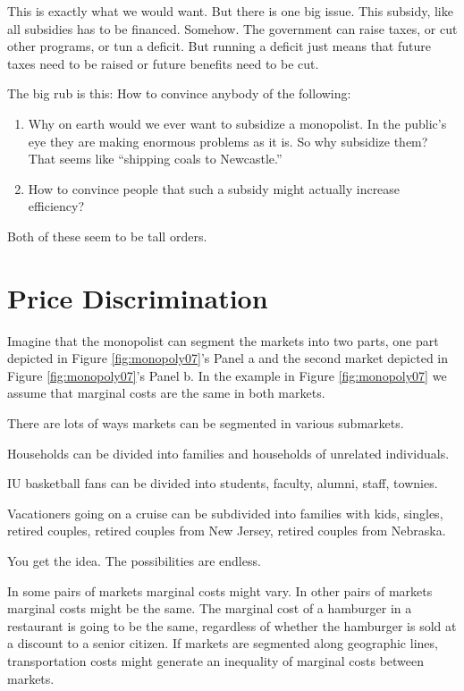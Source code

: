 \documentclass[
]{book}
\providecommand{\tightlist}{%
  \setlength{\itemsep}{0pt}\setlength{\parskip}{0pt}}
\begin{document}
This is exactly what we would want. But there is one big issue. This subsidy, like all subsidies has to be financed. Somehow. The government can raise taxes, or cut other programs, or tun a deficit. But running a deficit just means that future taxes need to be raised or future benefits need to be cut.

The big rub is this: How to convince anybody of the following:

\begin{enumerate}
\def\labelenumi{\arabic{enumi}.}
\tightlist
\item
  Why on earth would we ever want to subsidize a monopolist. In the public's eye they are making enormous problems as it is. So why subsidize them? That seems like ``shipping coals to Newcastle.''
\item
  How to convince people that such a subsidy might actually increase efficiency?
\end{enumerate}

Both of these seem to be tall orders.

\hypertarget{price-discrimination}{%
\section{Price Discrimination}\label{price-discrimination}}

Imagine that the monopolist can segment the markets into two parts, one part depicted in Figure \ref{fig:monopoly07}'s Panel a and the second market depicted in Figure \ref{fig:monopoly07}'s Panel b. In the example in Figure \ref{fig:monopoly07} we assume that marginal costs are the same in both markets.

There are lots of ways markets can be segmented in various submarkets.

Households can be divided into families and households of unrelated individuals.

IU basketball fans can be divided into students, faculty, alumni, staff, townies.

Vacationers going on a cruise can be subdivided into families with kids, singles, retired couples, retired couples from New Jersey, retired couples from Nebraska.

You get the idea. The possibilities are endless.

In some pairs of markets marginal costs might vary. In other pairs of markets marginal costs might be the same. The marginal cost of a hamburger in a restaurant is going to be the same, regardless of whether the hamburger is sold at a discount to a senior citizen. If markets are segmented along geographic lines, transportation costs might generate an inequality of marginal costs between markets.
\end{document}
